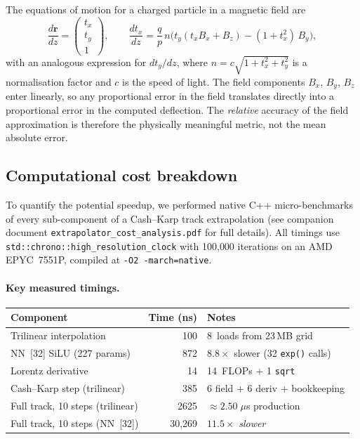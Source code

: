 \documentclass[11pt,a4paper]{article}
\begin{document}
The equations of motion for a charged particle in a magnetic field are
\begin{equation}
    \frac{d\mathbf{r}}{dz} = \begin{pmatrix} t_x \\ t_y \\ 1 \end{pmatrix},
    \qquad
    \frac{dt_x}{dz} = \frac{q}{p}\,n\bigl(
        t_y(t_x B_x + B_z) - (1+t_x^2)\,B_y
    \bigr),
    \label{eq:lorentz}
\end{equation}
with an analogous expression for $dt_y/dz$, where
$n = c\sqrt{1 + t_x^2 + t_y^2}$ is a normalisation factor and $c$ is the
speed of light.  The field components $B_x$, $B_y$, $B_z$ enter
linearly, so any proportional error in the field translates directly
into a proportional error in the computed deflection.  The
\emph{relative} accuracy of the field approximation is therefore the
physically meaningful metric, not the mean absolute error.

\subsection{Computational cost breakdown}
\label{sec:cost}

To quantify the potential speedup, we performed native C++
micro-benchmarks of every sub-component of a Cash--Karp track
extrapolation (see companion document
\texttt{extrapolator\_cost\_analysis.pdf} for full details).  All
timings use \texttt{std::chrono::high\_resolution\_clock} with
100{,}000 iterations on an AMD EPYC~7551P, compiled at
\texttt{-O2~-march=native}.

\paragraph{Key measured timings.}
\begin{center}
\begin{tabular}{lrl}
\toprule
Component & Time (ns) & Notes \\
\midrule
Trilinear interpolation & 100 & 8~loads from 23\,MB grid \\
NN~[32] SiLU (227 params) & 872 & $8.8\times$ slower (32 \texttt{exp()} calls)\\
Lorentz derivative & 14 & 14~FLOPs + 1 \texttt{sqrt} \\
Cash--Karp step (trilinear) & 385 & 6 field + 6 deriv + bookkeeping \\
Full track, 10 steps (trilinear) & 2625 & $\approx 2.50\;\mu$s production \\
Full track, 10 steps (NN~[32]) & 30{,}269 & $11.5\times$ \emph{slower} \\
\bottomrule
\end{tabular}
\end{center}
\end{document}
